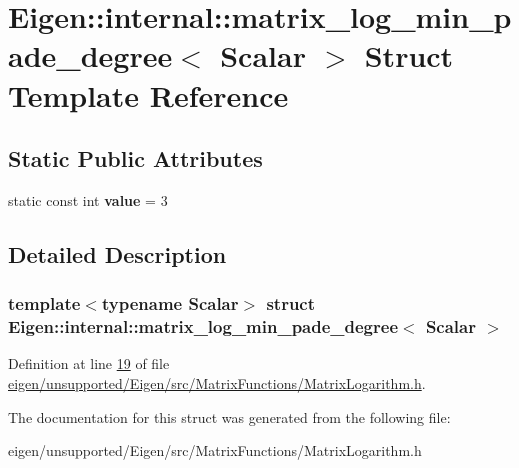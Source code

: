 \hypertarget{struct_eigen_1_1internal_1_1matrix__log__min__pade__degree}{}\section{Eigen\+:\+:internal\+:\+:matrix\+\_\+log\+\_\+min\+\_\+pade\+\_\+degree$<$ Scalar $>$ Struct Template Reference}
\label{struct_eigen_1_1internal_1_1matrix__log__min__pade__degree}
\subsection*{Static Public Attributes}
\begin{DoxyCompactItemize}
\item 
\mbox{\label{struct_eigen_1_1internal_1_1matrix__log__min__pade__degree_a4faf1f31c71592eb2dea87ad99fffa8f}} 
static const int {\bfseries value} = 3
\end{DoxyCompactItemize}


\subsection{Detailed Description}
\subsubsection*{template$<$typename Scalar$>$\newline
struct Eigen\+::internal\+::matrix\+\_\+log\+\_\+min\+\_\+pade\+\_\+degree$<$ Scalar $>$}



Definition at line \hyperlink{eigen_2unsupported_2_eigen_2src_2_matrix_functions_2_matrix_logarithm_8h_source_l00019}{19} of file \hyperlink{eigen_2unsupported_2_eigen_2src_2_matrix_functions_2_matrix_logarithm_8h_source}{eigen/unsupported/\+Eigen/src/\+Matrix\+Functions/\+Matrix\+Logarithm.\+h}.



The documentation for this struct was generated from the following file\+:\begin{DoxyCompactItemize}
\item 
eigen/unsupported/\+Eigen/src/\+Matrix\+Functions/\+Matrix\+Logarithm.\+h\end{DoxyCompactItemize}
